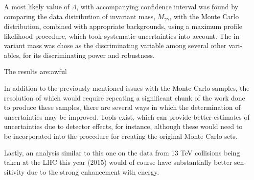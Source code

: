 \begin{english}
A most likely value of $\Lambda$, with accompanying confidence interval was found by comparing the data distribution of invariant mass, $M_{\gamma\gamma}$, with the Monte Carlo distribution, combined with appropriate backgrounds, using a maximum profile likelihood procedure, which took systematic uncertainties into account. The invariant mass was chose as the discriminating variable among several other variables, for its discriminating power and robustness.

The results are:awful

In addition to the previously mentioned issues with the Monte Carlo samples, the resolution of which would require repeating a significant chunk of the work done to produce these samples, there are several ways in which the determination of uncertainties may be improved. Tools exist, which can provide better estimates of uncertainties due to detector effects, for instance, although these would need to be incorporated into the procedure for creating the original Monte Carlo sets.

Lastly, an analysis similar to this one on the data from 13 TeV collisions being taken at the LHC this year (2015) would of course have substantially better sensitivity due to the strong enhancement with energy.

\printbibliography[title=References]



\end{english}


